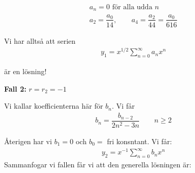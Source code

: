 \begin{equation*}
  \begin{gathered}
    a_n = 0 \text{ för alla udda $n$}\\
    a_2 = \dfrac{a_0}{14},\qquad a_4 = \dfrac{a_2}{44}=\dfrac{a_0}{616}
  \end{gathered}
\end{equation*}
\par\bigskip
\noindent Vi har alltså att serien 
\begin{equation*}
  \begin{gathered}
    y_1 = x^{1/2}\sum_{n=0}^{\infty}a_nx^n
  \end{gathered}
\end{equation*}\par
\noindent är en lösning!
\par\bigskip
\noindent \textbf{Fall 2:} $r=r_2=-1$
\par\bigskip
\noindent Vi kallar koefficienterna här för $b_n$. Vi får
\begin{equation*}
  \begin{gathered}
    b_n =\dfrac{b_{n-2}}{2n^2-3n}\qquad n\geq2
  \end{gathered}
\end{equation*}\par
\noindent Återigen har vi $b_1 = 0$ och $b_0=$ fri konsntant. Vi får:
\begin{equation*}
  \begin{gathered}
    y_2 = x^{-1}\sum_{n=0}^{\infty}b_nx^n
  \end{gathered}
\end{equation*}
\newpage
\noindent Sammanfogar vi fallen får vi att den generella lösningen är:

